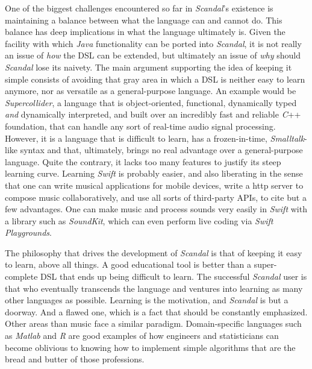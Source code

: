 One of the biggest challenges encountered so far in \emph{Scandal}'s existence is maintaining a balance between what the language can and cannot do. This balance has deep implications in what the language ultimately is. Given the facility with which \emph{Java} functionality can be ported into \emph{Scandal}, it is not really an issue of \emph{how} the DSL can be extended, but ultimately an issue of \emph{why} should \emph{Scandal} lose its naivety. The main argument supporting the idea of keeping it simple consists of avoiding that gray area in which a DSL is neither easy to learn anymore, nor as versatile as a general-purpose language. An example would be \emph{Supercollider}, a language that is object-oriented, functional, dynamically typed \emph{and} dynamically interpreted, and built over an incredibly fast and reliable \emph{C}++ foundation, that can handle any sort of real-time audio signal processing. However, it is a language that is difficult to learn, has a frozen-in-time, \emph{Smalltalk}-like syntax and that, ultimately, brings no real advantage over a general-purpose language. Quite the contrary, it lacks too many features to justify its steep learning curve. Learning \emph{Swift} is probably easier, and also liberating in the sense that one can write musical applications for mobile devices, write a http server to compose music collaboratively, and use all sorts of third-party APIs, to cite but a few advantages. One can make music and process sounds very easily in \emph{Swift} with a library such as \emph{SoundKit}, which can even perform live coding via \emph{Swift Playgrounds}.

The philosophy that drives the development of \emph{Scandal} is that of keeping it easy to learn, above all things. A good educational tool is better than a super-complete DSL that ends up being difficult to learn. The successful \emph{Scandal} user is that who eventually transcends the language and ventures into learning as many other languages as possible. Learning is the motivation, and \emph{Scandal} is but a doorway. And a flawed one, which is a fact that should be constantly emphasized. Other areas than music face a similar paradigm. Domain-specific languages such as \emph{Matlab} and \emph{R} are good examples of how engineers and statisticians can become oblivious to knowing how to implement simple algorithms that are the bread and butter of those professions.

